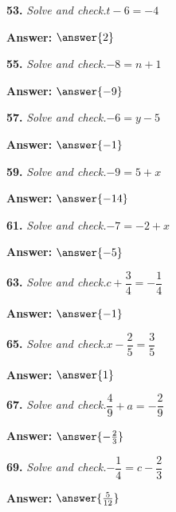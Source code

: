 \documentclass{ximera}
\begin{document}
\begin{problem}
\textbf{53.} \emph{Solve and check.}\quad $t - 6 = -4$

\textbf{Answer:} $\answer{2}$
\end{problem}

\begin{problem}
\textbf{55.} \emph{Solve and check.}\quad $-8 = n + 1$

\textbf{Answer:} $\answer{-9}$
\end{problem}

\begin{problem}
\textbf{57.} \emph{Solve and check.}\quad $-6 = y - 5$

\textbf{Answer:} $\answer{-1}$
\end{problem}

\begin{problem}
\textbf{59.} \emph{Solve and check.}\quad $-9 = 5 + x$

\textbf{Answer:} $\answer{-14}$
\end{problem}

\begin{problem}
\textbf{61.} \emph{Solve and check.}\quad $-7 = -2 + x$

\textbf{Answer:} $\answer{-5}$
\end{problem}

\begin{problem}
\textbf{63.} \emph{Solve and check.}\quad $c + \dfrac{3}{4} = -\dfrac{1}{4}$

\textbf{Answer:} $\answer{-1}$
\end{problem}

\begin{problem}
\textbf{65.} \emph{Solve and check.}\quad $x - \dfrac{2}{5} = \dfrac{3}{5}$

\textbf{Answer:} $\answer{1}$
\end{problem}

\begin{problem}
\textbf{67.} \emph{Solve and check.}\quad $\dfrac{4}{9} + a = -\dfrac{2}{9}$

\textbf{Answer:} $\answer{-\frac{2}{3}}$
\end{problem}

\begin{problem}
\textbf{69.} \emph{Solve and check.}\quad $-\dfrac{1}{4} = c - \dfrac{2}{3}$

\textbf{Answer:} $\answer{\frac{5}{12}}$
\end{problem}
\end{document}

